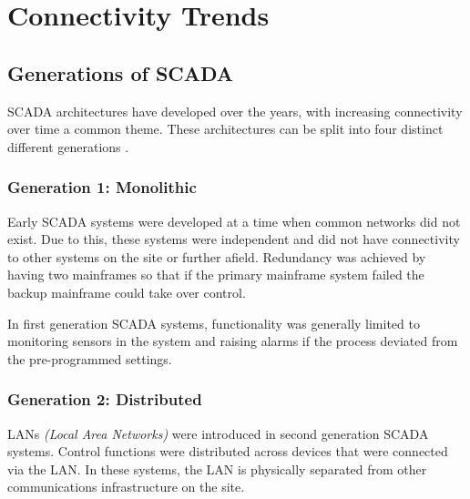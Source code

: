 
\pagebreak
\section{Connectivity Trends}

\subsection{Generations of SCADA}
SCADA architectures have developed over the years, with increasing connectivity over time a common theme. These architectures can be split into four distinct different generations \citep{site:edgefxkits:scada:20141014}.
\subsubsection*{Generation 1: Monolithic}
Early SCADA systems were developed at a time when common networks did not exist. Due to this, these systems were independent and did not have connectivity to other systems on the site or further afield. Redundancy was achieved by having two mainframes so that if the primary mainframe system failed the backup mainframe could take over control.

In first generation SCADA systems, functionality was generally limited to monitoring sensors in the system and raising alarms if the process deviated from the pre-programmed settings.
\subsubsection*{Generation 2: Distributed}
LANs \textit{(Local Area Networks)} were introduced in second generation SCADA systems. Control functions were distributed across devices that were connected via the LAN. In these systems, the LAN is physically separated from other communications infrastructure on the site.

